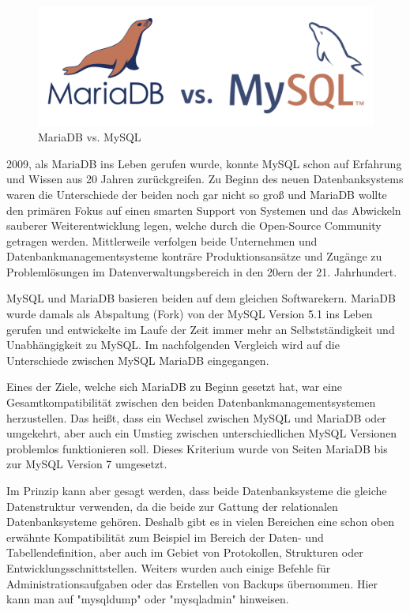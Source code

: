 
\begin{figure}[H]
    \centering
    \includegraphics[width=\textwidth]{media/MariaDB/mariavsmy.png}
    \caption{MariaDB vs. MySQL \cite{MariaVsMyBild}}
    \label{fig:MariavsMy}
\end{figure}

2009, als MariaDB ins Leben gerufen wurde, konnte MySQL schon auf Erfahrung und Wissen aus 20 Jahren zurückgreifen. Zu Beginn des neuen Datenbanksystems waren die Unterschiede der beiden noch gar nicht so groß und MariaDB wollte den primären Fokus auf einen smarten Support von Systemen und das Abwickeln sauberer Weiterentwicklung legen, welche durch die Open-Source Community getragen werden. Mittlerweile verfolgen beide Unternehmen und Datenbankmanagementsysteme konträre Produktionsansätze und Zugänge zu Problemlösungen im Datenverwaltungsbereich in den 20ern der 21. Jahrhundert. \cite{MariaVsMy}

MySQL und MariaDB basieren beiden auf dem gleichen Softwarekern. MariaDB wurde damals als Abspaltung (Fork) von der MySQL Version 5.1 ins Leben gerufen und entwickelte im Laufe der Zeit immer mehr an Selbstständigkeit und Unabhängigkeit zu MySQL. Im nachfolgenden Vergleich wird auf die Unterschiede zwischen MySQL MariaDB eingegangen. \cite{MariaVsMy}


Eines der Ziele, welche sich MariaDB zu Beginn gesetzt hat, war eine Gesamtkompatibilität zwischen den beiden Datenbankmanagementsystemen herzustellen. Das heißt, dass ein Wechsel zwischen MySQL und MariaDB oder umgekehrt, aber auch ein Umstieg zwischen unterschiedlichen MySQL Versionen problemlos funktionieren soll. Dieses Kriterium wurde von Seiten MariaDB bis zur MySQL Version 7 umgesetzt. \cite{MariaVsMy}

Im Prinzip kann aber gesagt werden, dass beide Datenbanksysteme die gleiche Datenstruktur verwenden, da die beide zur Gattung der relationalen Datenbanksysteme gehören. Deshalb gibt es in vielen Bereichen eine schon oben erwähnte Kompatibilität zum Beispiel im Bereich der Daten- und Tabellendefinition, aber auch im Gebiet von Protokollen, Strukturen oder Entwicklungsschnittstellen. Weiters wurden auch einige Befehle für Administrationsaufgaben oder das Erstellen von Backups übernommen. Hier kann man auf "mysqldump" oder "mysqladmin" hinweisen. \cite{MariaVsMy}

